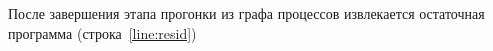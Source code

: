 После завершения этапа прогонки из графа процессов извлекается остаточная программа
(строка~\ref{line:resid})





